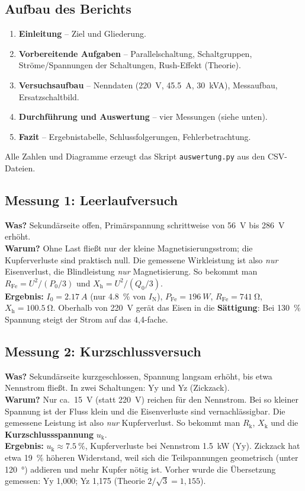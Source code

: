 \documentclass[a4paper,11pt]{article}
\begin{document}
\subsection{Aufbau des Berichts}
\begin{enumerate}[nosep]
  \item \textbf{Einleitung} -- Ziel und Gliederung.
  \item \textbf{Vorbereitende Aufgaben} -- Parallelschaltung, Schaltgruppen, Ströme/Spannungen der Schaltungen, Rush-Effekt (Theorie).
  \item \textbf{Versuchsaufbau} -- Nenndaten (\SI{220}{V}, \SI{45,5}{A}, \SI{30}{kVA}), Messaufbau, Ersatzschaltbild.
  \item \textbf{Durchführung und Auswertung} -- vier Messungen (siehe unten).
  \item \textbf{Fazit} -- Ergebnistabelle, Schlussfolgerungen, Fehlerbetrachtung.
\end{enumerate}
Alle Zahlen und Diagramme erzeugt das Skript \texttt{auswertung.py} aus den CSV-Dateien.

\subsection{Messung 1: Leerlaufversuch}
\textbf{Was?} Sekundärseite offen, Primärspannung schrittweise von \SI{56}{V} bis \SI{286}{V} erhöht.\\
\textbf{Warum?} Ohne Last fließt nur der kleine Magnetisierungsstrom; die Kupferverluste sind praktisch null. Die gemessene Wirkleistung ist also \emph{nur} Eisenverlust, die Blindleistung \emph{nur} Magnetisierung. So bekommt man $R_\mathrm{Fe}=U^2/(P_0/3)$ und $X_\mathrm{h}=U^2/(Q_0/3)$.\\
\textbf{Ergebnis:} $I_0=\SI{2,17}{A}$ (nur \SI{4,8}{\%} von $I_\mathrm{N}$), $P_\mathrm{Fe}=\SI{196}{W}$, $R_\mathrm{Fe}=\SI{741}{\ohm}$, $X_\mathrm{h}=\SI{100,5}{\ohm}$. Oberhalb von \SI{220}{V} gerät das Eisen in die \textbf{Sättigung}: Bei \SI{130}{\%} Spannung steigt der Strom auf das 4,4-fache.

\subsection{Messung 2: Kurzschlussversuch}
\textbf{Was?} Sekundärseite kurzgeschlossen, Spannung langsam erhöht, bis etwa Nennstrom fließt. In zwei Schaltungen: Yy und Yz (Zickzack).\\
\textbf{Warum?} Nur ca.\ \SI{15}{V} (statt \SI{220}{V}) reichen für den Nennstrom. Bei so kleiner Spannung ist der Fluss klein und die Eisenverluste sind vernachlässigbar. Die gemessene Leistung ist also \emph{nur} Kupferverlust. So bekommt man $R_\mathrm{k}$, $X_\mathrm{k}$ und die \textbf{Kurzschlussspannung} $u_\mathrm{k}$.\\
\textbf{Ergebnis:} $u_\mathrm{k}\approx\SI{7,5}{\%}$, Kupferverluste bei Nennstrom \SI{1,5}{kW} (Yy). Zickzack hat etwa \SI{19}{\%} höheren Widerstand, weil sich die Teilspannungen geometrisch (unter \SI{120}{\degree}) addieren und mehr Kupfer nötig ist. Vorher wurde die Übersetzung gemessen: Yy 1,000; Yz 1,175 (Theorie $2/\sqrt3=1{,}155$).
\end{document}

